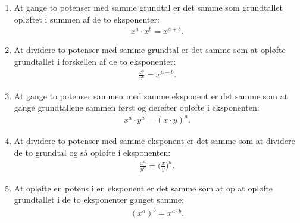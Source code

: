 \begin{enumerate}
\item At gange to potenser med samme grundtal er det samme som grundtallet opløftet i summen af de to eksponenter:
\begin{align*}
x^a \cdot x^b = x^{a+b}.
\end{align*}
\item At dividere to potenser med samme grundtal er det samme som at opløfte grundtallet i forskellen af de to eksponenter:
\begin{align*}
\frac{x^a}{x^b}=x^{a-b}.
\end{align*}
\item At gange to potenser sammen med samme eksponent er det samme som at gange grundtallene sammen først og derefter opløfte i eksponenten:
\begin{align*}
x^a \cdot y^a = (x\cdot y)^a.
\end{align*}
\item At dividere to potenser med samme eksponent er det samme som at dividere de to grundtal og så opløfte i eksponenten:
\begin{align*}
\frac{x^a}{y^a}= \Big( \frac{x}{y} \Big)^a.
\end{align*}
\item At opløfte en potens i en eksponent er det samme som at op at opløfte grundtallet i de to eksponenter ganget samme:
\begin{align*}
(x^a)^b=x^{a \cdot b}.
\end{align*}
\end{enumerate}

